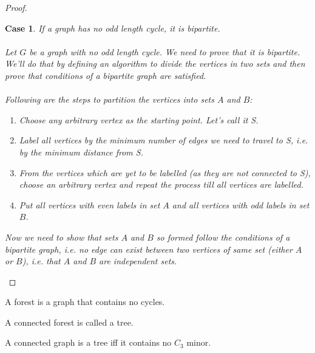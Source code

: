\documentclass{article}
\newtheorem{case}{Case}
\begin{document}
\begin{proof}
    \begin{case}
        If a graph has no odd length cycle, it is bipartite.\\
        \\
        Let $G$ be a graph with no odd length cycle. We need to prove that it is bipartite. We'll do that by defining an algorithm to divide the vertices in two sets and then prove that conditions of a bipartite graph are satisfied.\\
        \\Following are the steps to partition the vertices into sets $A$ and $B$:
        \begin{enumerate}
            \item Choose any arbitrary vertex as the starting point. Let's call it S.
            \item Label all vertices by the minimum number of edges we need to travel to S, i.e. by the minimum distance from S.
            \item From the vertices which are yet to be labelled (as they are not connected to S), choose an arbitrary vertex and repeat the process till all vertices are labelled.
            \item Put all vertices with even labels in set $A$ and all vertices with odd labels in set $B$.
        \end{enumerate}
        Now we need to show that sets $A$ and $B$ so formed follow the conditions of a bipartite graph, i.e. no edge can exist between two vertices of same set (either $A$ or $B$), i.e. that $A$ and $B$ are independent sets.
    \end{case}
\end{proof}
  
\begin{definition}
    A forest is a graph that contains no cycles.
\end{definition}
\begin{definition}
    A connected forest is called a tree.
\end{definition}
\begin{theorem}
    A connected graph is a tree iff it contains no {$C_3$} minor.
\end{theorem}
\end{document}
